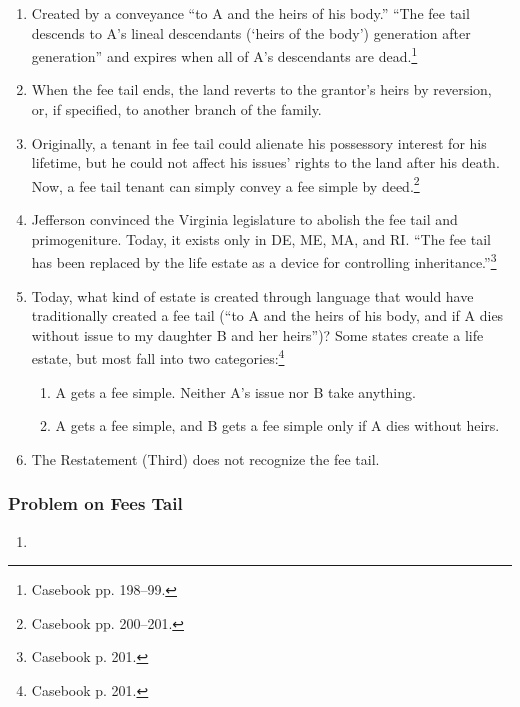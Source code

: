\begin{enumerate}
    \item Created by a conveyance ``to A and the heirs of his 
    body.'' ``The fee tail descends to A's lineal descendants (`heirs of the 
    body') generation after generation'' and expires when all of A's 
    descendants are dead.\footnote{Casebook pp. 198--99.}
    \item When the fee tail ends, the land reverts to the grantor's heirs by 
    reversion, or, if specified, to another branch of the family.
    \item Originally, a tenant in fee tail could alienate his possessory 
    interest for his lifetime, but he could not affect his issues' rights to 
    the land after his death. Now, a fee tail tenant can simply convey a fee 
    simple by deed.\footnote{Casebook pp. 200--201.}
    \item Jefferson convinced the Virginia legislature to abolish the fee tail 
    and primogeniture. Today, it exists only in DE, ME, MA, and RI. ``The fee 
    tail has been replaced by the life estate as a device for controlling 
    inheritance.''\footnote{Casebook p. 201.}
    \item Today, what kind of estate is created through language that would 
    have traditionally created a fee tail (``to A and the heirs of his 
    body, and if A dies without issue to my daughter B and her heirs'')? Some 
    states create a life estate, but most fall into two 
    categories:\footnote{Casebook p. 201.}
    \begin{enumerate}
        \item A gets a fee simple. Neither A's issue nor B take anything.
        \item A gets a fee simple, and B gets a fee simple only if A dies 
        without heirs.
    \end{enumerate}
    \item The Restatement (Third) does not recognize the fee tail.
\end{enumerate}

\subsubsection{Problem on Fees Tail}

\begin{enumerate}
    \item %
\end{enumerate}

